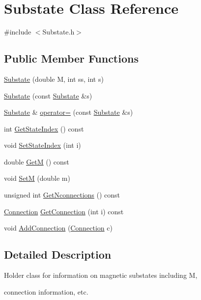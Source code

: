 \hypertarget{classSubstate}{\section{Substate Class Reference}
\label{classSubstate}
}


{\ttfamily \#include $<$Substate.\-h$>$}

\subsection*{Public Member Functions}
\begin{DoxyCompactItemize}
\item 
\hyperlink{classSubstate_adc55a0114f54fd9e2e0b284e77177077}{Substate} (double M, int ss, int s)
\item 
\hyperlink{classSubstate_a094e9816b8d0e1ca8a925060aa666a10}{Substate} (const \hyperlink{classSubstate}{Substate} \&s)
\item 
\hyperlink{classSubstate}{Substate} \& \hyperlink{classSubstate_a1fdb1a8a82baf2d03f42a1b7ce37421d}{operator=} (const \hyperlink{classSubstate}{Substate} \&s)
\item 
int \hyperlink{classSubstate_abb2e99735df6a7f342236b08d6845f19}{Get\-State\-Index} () const 
\item 
void \hyperlink{classSubstate_ae5dc83066f50c796155954d7f9c3c1b8}{Set\-State\-Index} (int i)
\item 
double \hyperlink{classSubstate_aa24ecbfaab39eeeb1bbefeb833031930}{Get\-M} () const 
\item 
void \hyperlink{classSubstate_ab36c3c3b2a3862f67d8f0ca69c79b625}{Set\-M} (double m)
\item 
unsigned int \hyperlink{classSubstate_a720d7bdf9c506bde448c9dd68eaa2914}{Get\-Nconnections} () const 
\item 
\hyperlink{classConnection}{Connection} \hyperlink{classSubstate_af5850558a667f170661f5fcb7bcc9f28}{Get\-Connection} (int i) const 
\item 
void \hyperlink{classSubstate_a14f86d11fdf7540b3a6efd5006900cea}{Add\-Connection} (\hyperlink{classConnection}{Connection} c)
\end{DoxyCompactItemize}


\subsection{Detailed Description}
\begin{DoxyVerb}Holder class for information on magnetic substates including M, 
\end{DoxyVerb}
 connection information, etc.

